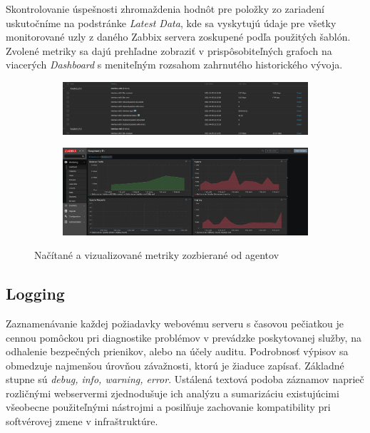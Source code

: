 \documentclass[12pt, a4paper]{article}
\begin{document}
Skontrolovanie úspešnosti zhromaždenia hodnôt pre položky zo zariadení uskutočníme na 
podstránke \emph{Latest Data}, kde sa vyskytujú údaje pre všetky monitorované uzly
z daného Zabbix servera zoskupené podľa použitých šablón. Zvolené metriky sa dajú prehľadne zobraziť v 
prispôsobiteľných grafoch na viacerých \emph{Dashboard} s meniteľným rozsahom zahrnutého
historického vývoja.
\begin{figure}[h]
	\centering
		\begin{subfigure}[t]{\textwidth}
  		\centering
  		\includegraphics[width=\textwidth]{images/zabbix-eth-rpi2.png}
	\end{subfigure}
	\vspace{1em}
	\begin{subfigure}[t]{\textwidth}
  		\centering
  		\includegraphics[width=\textwidth]{images/zabbix-dashboard.png}
	\end{subfigure}
	\caption{Načítané a vizualizované metriky zozbierané od agentov}
\end{figure}

\subsection{Logging}
Zaznamenávanie každej požiadavky webovému serveru s časovou pečiatkou je cennou pomôckou pri diagnostike 
problémov v prevádzke poskytovanej služby, na odhalenie bezpečných prienikov, alebo na účely auditu. 
Podrobnosť výpisov sa obmedzuje najmenšou úrovňou závažnosti, ktorú je žiaduce zapísať. Základné stupne
sú \emph{debug, info, warning, error}. Ustálená textová podoba záznamov naprieč rozličnými webservermi 
zjednodušuje ich analýzu a sumarizáciu existujúcimi všeobecne použiteľnými nástrojmi a posilňuje zachovanie 
kompatibility pri softvérovej zmene v infraštruktúre. 
\end{document}
